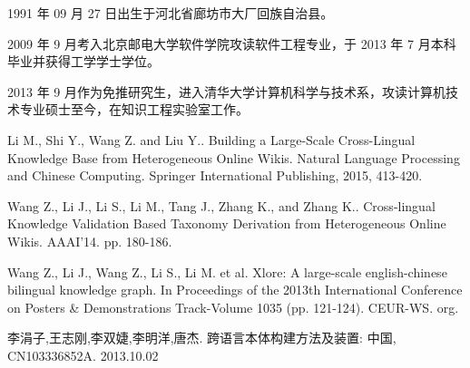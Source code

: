 \begin{resume}


  1991 年 09 月 27 日出生于河北省廊坊市大厂回族自治县。

  2009 年 9 月考入北京邮电大学软件学院攻读软件工程专业，于 2013 年 7 月本科毕业并获得工学学士学位。 

  2013 年 9 月作为免推研究生，进入清华大学计算机科学与技术系，攻读计算机技术专业硕士至今，在知识工程实验室工作。


  \begin{publications}
    \item Li M., Shi Y., Wang Z. and Liu Y.. Building a Large-Scale Cross-Lingual Knowledge Base from Heterogeneous Online Wikis. Natural Language Processing and Chinese Computing. Springer International Publishing, 2015, 413-420.
    \item Wang Z., Li J., Li S., Li M., Tang J., Zhang K., and Zhang K.. Cross-lingual Knowledge Validation Based Taxonomy Derivation from Heterogeneous Online Wikis. AAAI'14. pp. 180-186.
    \item Wang Z., Li J., Wang Z., Li S., Li M. et al. Xlore: A large-scale english-chinese bilingual knowledge graph. In Proceedings of the 2013th International Conference on Posters \& Demonstrations Track-Volume 1035 (pp. 121-124). CEUR-WS. org.
  \end{publications}



  \begin{achievements}
    \item 李涓子,王志刚,李双婕,李明洋,唐杰. 跨语言本体构建方法及装置: 中国, CN103336852A. 2013.10.02
  \end{achievements}

\end{resume}
